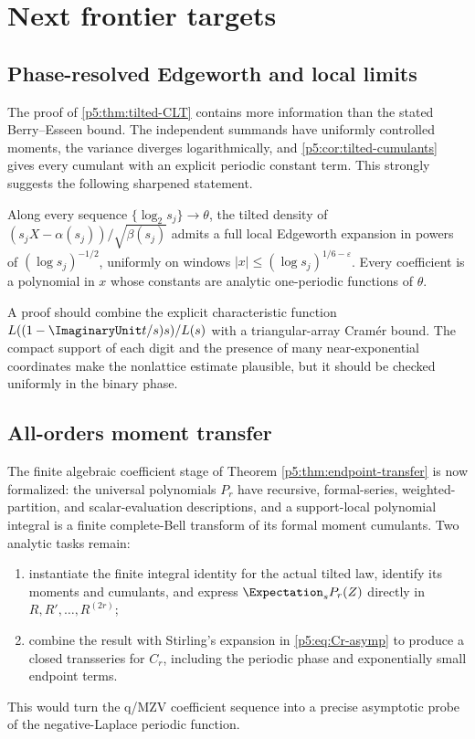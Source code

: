\documentclass[11pt]{article}
\numberwithin{equation}{section}
\theoremstyle{definition}
\theoremstyle{remark}
\begin{document}
\section{Next frontier targets}

\subsection{Phase-resolved Edgeworth and local limits}

The proof of \cref{p5:thm:tilted-CLT} contains more information than the stated
Berry--Esseen bound.  The independent summands have uniformly controlled
moments, the variance diverges logarithmically, and
\cref{p5:cor:tilted-cumulants} gives every cumulant with an explicit periodic
constant term.  This strongly suggests the following sharpened statement.

\begin{conjecture}
\label{p5:conj:Edgeworth}
Along every sequence $\{\log_2s_j\}\to\theta$, the tilted density of
$(s_jX-\alpha(s_j))/\sqrt{\beta(s_j)}$ admits a full local Edgeworth expansion
in powers of $(\log s_j)^{-1/2}$, uniformly on windows
$|x|\le(\log s_j)^{1/6-\varepsilon}$.  Every coefficient is a polynomial in
$x$ whose constants are analytic one-periodic functions of $\theta$.
\end{conjecture}

A proof should combine the explicit characteristic function
$L((1-\ImaginaryUnit t/s)s)/L(s)$ with a triangular-array Cram\'er bound.  The compact
support of each digit and the presence of many near-exponential coordinates
make the nonlattice estimate plausible, but it should be checked uniformly in
the binary phase.

\subsection{All-orders moment transfer}

The finite algebraic coefficient stage of Theorem \ref{p5:thm:endpoint-transfer}
is now formalized: the universal polynomials \(P_r\) have recursive,
formal-series, weighted-partition, and scalar-evaluation descriptions, and a
support-local polynomial integral is a finite complete-Bell transform of its
formal moment cumulants.  Two analytic tasks remain:
\begin{enumerate}
\item instantiate the finite integral identity for the actual tilted law,
      identify its moments and cumulants, and express
      $\Expectation_sP_r(Z)$ directly in $R,R',\dots,R^{(2r)}$;
\item combine the result with Stirling's expansion in \cref{p5:eq:Cr-asymp} to
      produce a closed transseries for $C_r$, including the periodic phase and
      exponentially small endpoint terms.
\end{enumerate}
This would turn the q/MZV coefficient sequence into a precise asymptotic probe
of the negative-Laplace periodic function.
\end{document}
